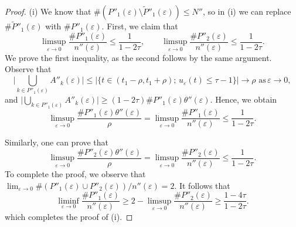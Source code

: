 \documentclass[12pt]{article}
\numberwithin{equation}{section}
\def\e{\varepsilon}
\begin{document}
\begin{proof}
(i) We know that $\#(P''_{1}(\varepsilon)\setminus \widetilde{P}''_{1}(\varepsilon))\leq N''$, so in {\rm(i)} we can replace $\#\widetilde{P}''_{1}(\varepsilon)$ with $\#P''_{1}(\varepsilon).$ 
First, we claim that 
\[
\limsup_{\varepsilon\to0}\frac{\#P''_{1}(\varepsilon)}{n''(\varepsilon)}\le\frac{1}{1-2\tau},\qquad\limsup_{\varepsilon\to0}\frac{\#P''_{2}(\varepsilon)}{n''(\varepsilon)}\le\frac{1}{1-2\tau}.
\]
We prove the first inequality, as the second follows by the same argument. 
Observe that 
\[
\Big|\bigcup_{k\in P''_{1}(\varepsilon)}A''_{k}(\varepsilon)\Big|\le|\{t\in(t_{1}-\rho,t_{1}+\rho);\,u_{\varepsilon}(t)\le\tau-1\}|\to\rho\,\,\text{as}\,\varepsilon\to0,
\]
and
$\displaystyle\Big|\bigcup_{k\in P''_{1}(\varepsilon)}A''_{k}(\varepsilon)\Big|\ge(1-2\tau)\#P''_{1}(\varepsilon)\theta''(\e)$.
Hence, we obtain
\[
\limsup_{\varepsilon\to0}\frac{\#P''_{1}(\varepsilon)\theta''(\e)}{\rho}=\limsup_{\varepsilon\to0}\frac{\#P''_{1}(\varepsilon)}{n''(\varepsilon)}\le\frac{1}{1-2\tau}.
\]

Similarly, one can prove that
\[
\limsup_{\varepsilon\to0}\frac{\#P''_{2}(\varepsilon)\theta''(\e)}{\rho}=\limsup_{\varepsilon\to0}\frac{\#P''_{2}(\varepsilon)}{n''(\varepsilon)}\le\frac{1}{1-2\tau}.
\]
To complete the proof, we observe that $\lim_{\varepsilon\to0}\#(P''_{1}(\varepsilon)\cup P''_{2}(\varepsilon))/n''(\varepsilon)=2
$. It follows that
\[
\liminf_{\varepsilon\to0}\frac{\#P''_{1}(\varepsilon)}{n''(\varepsilon)}\ge2-\limsup_{\varepsilon\to0}\frac{\#P''_{2}(\varepsilon)}{n''(\varepsilon)}\ge\frac{1-4\tau}{1-2\tau}.
\]
which completes the proof of {\rm(i)}.


\end{proof}
\end{document}
